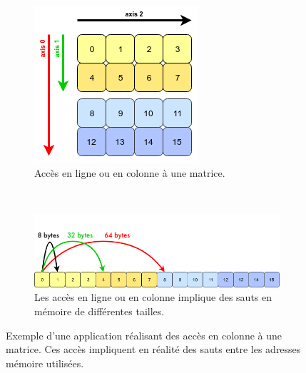     \begin{figure}
        \centering
            \begin{subfigure}[b]{0.25\linewidth}
            \includegraphics[width=\linewidth]{images/dml_strides_acces_matrix.png}
            \caption{Accès en ligne ou en colonne à une matrice.}
            \label{pic:dml_strides_acces_matrix}
            \end{subfigure}
        ~ %
            \begin{subfigure}[b]{0.60\linewidth}
            \includegraphics[width=\linewidth]{images/dml_strides_acces.png}
            \caption{Les accès en ligne ou en colonne implique des sauts en mémoire de différentes tailles.}
            \label{pic:dml_strides_acces}
            \end{subfigure}
        \caption{Exemple d'une application réalisant des accès en colonne à une matrice. Ces accès impliquent en réalité des sauts entre les adresses mémoire utilisées.}\label{pic:dml_strides_acces_main}
    \end{figure}
        

